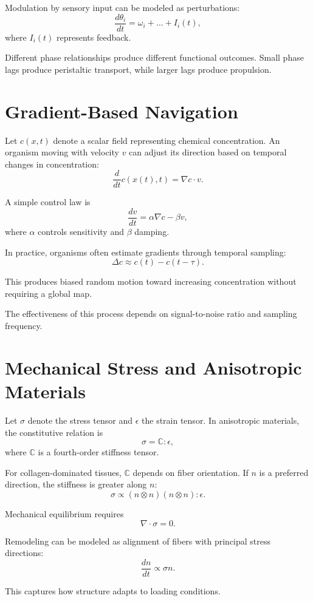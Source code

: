 \documentclass[11pt,oneside]{book}
\begin{document}
Modulation by sensory input can be modeled as perturbations:
\[
\frac{d\theta_i}{dt} = \omega_i + \dots + I_i(t),
\]
where $I_i(t)$ represents feedback.

Different phase relationships produce different functional outcomes. Small phase lags produce peristaltic transport, while larger lags produce propulsion.

\section{Gradient-Based Navigation}

Let $c(x,t)$ denote a scalar field representing chemical concentration. An organism moving with velocity $v$ can adjust its direction based on temporal changes in concentration:
\[
\frac{d}{dt} c(x(t), t) = \nabla c \cdot v.
\]

A simple control law is
\[
\frac{dv}{dt} = \alpha \nabla c - \beta v,
\]
where $\alpha$ controls sensitivity and $\beta$ damping.

In practice, organisms often estimate gradients through temporal sampling:
\[
\Delta c \approx c(t) - c(t - \tau).
\]

This produces biased random motion toward increasing concentration without requiring a global map.

The effectiveness of this process depends on signal-to-noise ratio and sampling frequency.

\section{Mechanical Stress and Anisotropic Materials}

Let $\sigma$ denote the stress tensor and $\epsilon$ the strain tensor. In anisotropic materials, the constitutive relation is
\[
\sigma = \mathbb{C} : \epsilon,
\]
where $\mathbb{C}$ is a fourth-order stiffness tensor.

For collagen-dominated tissues, $\mathbb{C}$ depends on fiber orientation. If $n$ is a preferred direction, the stiffness is greater along $n$:
\[
\sigma \propto (n \otimes n)(n \otimes n) : \epsilon.
\]

Mechanical equilibrium requires
\[
\nabla \cdot \sigma = 0.
\]

Remodeling can be modeled as alignment of fibers with principal stress directions:
\[
\frac{dn}{dt} \propto \sigma n.
\]

This captures how structure adapts to loading conditions.
\end{document}
